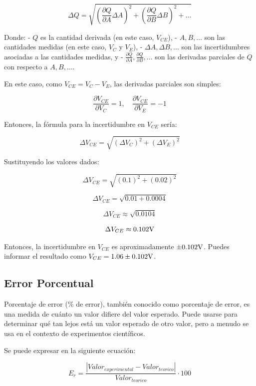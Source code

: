 \[ \Delta Q = \sqrt{\left(\frac{\partial Q}{\partial A} \Delta A\right)^2 + \left(\frac{\partial Q}{\partial B} \Delta B\right)^2 + \ldots} \]

Donde:
- \( Q \) es la cantidad derivada (en este caso, \( V_{CE} \)),
- \( A, B, \ldots \) son las cantidades medidas (en este caso, \( V_C \) y \( V_E \)),
- \( \Delta A, \Delta B, \ldots \) son las incertidumbres asociadas a las cantidades medidas, y
- \( \frac{\partial Q}{\partial A}, \frac{\partial Q}{\partial B}, \ldots \) son las derivadas parciales de \( Q \) con respecto a \( A, B, \ldots \).

En este caso, como \( V_{CE} = V_C - V_E \), las derivadas parciales son simples:

\[ \frac{\partial V_{CE}}{\partial V_C} = 1, \quad \frac{\partial V_{CE}}{\partial V_E} = -1 \]

Entonces, la fórmula para la incertidumbre en \( V_{CE} \) sería:

\[ \Delta V_{CE} = \sqrt{\left(\Delta V_C\right)^2 + \left(\Delta V_E\right)^2} \]

Sustituyendo los valores dados:

\[ \Delta V_{CE} = \sqrt{(0.1)^2 + (0.02)^2} \]

\[ \Delta V_{CE} = \sqrt{0.01 + 0.0004} \]

\[ \Delta V_{CE} \approx \sqrt{0.0104} \]

\[ \Delta V_{CE} \approx 0.102 \volt \]

Entonces, la incertidumbre en \( V_{CE} \) es aproximadamente \( \pm 0.102 \volt \). Puedes informar el resultado como \( V_{CE} = 1.06 \pm 0.102 \volt \).

\subsection{Error Porcentual}

Porcentaje de error (\% de error), también conocido como porcentaje de error, es una medida de cuánto un valor difiere del valor esperado. Puede usarse para determinar qué tan lejos está un valor esperado de otro valor, pero a menudo se usa en el contexto de experimentos científicos.

Se puede expresar en la siguiente ecuación:

\begin{equation}
    E_r =\dfrac{|Valor_{experimental}-Valor_{teorico}|}{Valor_{teorico}} \cdot  100
    \label{eqn:error}
\end{equation}

